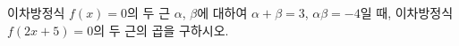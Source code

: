 이차방정식 $f(x)=0$의 두 근 $\alpha$, $\beta$에 대하여 $\alpha+\beta=3$, $\alpha\beta=-4$일 때, 이차방정식 $f(2x+5)=0$의 두 근의 곱을 구하시오.
